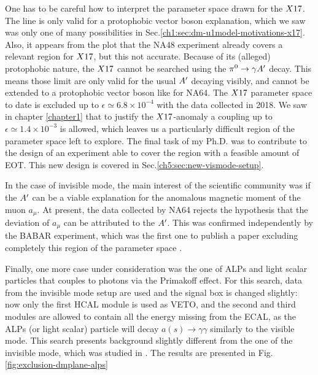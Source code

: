 One has to be careful how to interpret the parameter space drawn for the $X17$. The line is only valid for a protophobic vector boson explanation, which we saw was only one of many possibilities in Sec.\ref{ch1:sec:dm-u1model-motivations-x17}. Also, it appears from the plot that the NA48 experiment already covers a relevant region for $X17$, but this not accurate. Because of its (alleged) protophobic nature, the $X17$ cannot be searched using the $\pi^0 \rightarrow \gamma A'$ decay. This means those limit are only valid for the usual $A'$ decaying visibly, and cannot be extended to a protophobic vector boson like for NA64. The $X17$ parameter space to date is excluded up to $\epsilon \simeq 6.8 \times 10^{-4}$ with the data collected in 2018. We saw in chapter \ref{chapter1} that to justify the $X17$-anomaly a coupling up to $\epsilon \simeq 1.4 \times 10^{-3}$ is allowed, which leaves us a particularly difficult region of the parameter space left to explore. The final task of my Ph.D. was to contribute to the design of an experiment able to cover the region with a feasible amount of EOT. This new design is covered in Sec.\ref{ch5:sec:new-vismode-setup}.

In the case of invisible mode, the main interest of the scientific community was if the $A'$ can be a viable explanation for the anomalous magnetic moment of the muon $a_{\mu}$. At present, the data collected by NA64 rejects the hypothesis that the deviation of $a_{\mu}$ can be attributed to the $A'$. This was confirmed independently by the BABAR experiment, which was the first one to publish a paper excluding completely this region of the parameter space \cite{PhysRevLett.119.131804}.

Finally, one more case under consideration was the one of ALPs and light scalar particles that couples to photons via the Primakoff effect. For this search, data from the invisible mode setup are used and the signal box is changed slightly: now only the first HCAL module is used as VETO, and the second and third modules are allowed to contain all the energy missing from the ECAL, as the ALPs (or light scalar) particle will decay $a(s) \to \gamma \gamma$ similarly to the visible mode. This search presents background slightly different from the one of the invisible mode, which was studied in \cite{Banerjee:2020fue}. The results are presented in Fig.\ref{fig:exclusion-dmplane-alps}

